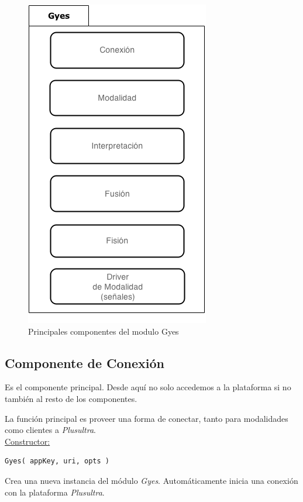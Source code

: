 \begin{center}
  \begin{figure}[h]
    \centering
    \includegraphics[scale=0.7]{gfx/gyes}
    \caption{Principales componentes del modulo Gyes}
    \label{fig:arq_ours_gyes}
  \end{figure}
\end{center}

\subsection{Componente de Conexión}

Es el componente principal. Desde aquí no solo accedemos a la plataforma si no también al resto de los componentes. 

La función principal es proveer una forma de conectar, tanto para modalidades como clientes a \emph{Plusultra}.
\\

\underline{\textsf{Constructor:}}\\
\begin{lstlisting}
Gyes( appKey, uri, opts )
\end{lstlisting}
Crea una nueva instancia del módulo \emph{Gyes}. Automáticamente inicia una conexión con la plataforma \emph{Plusultra}. 

